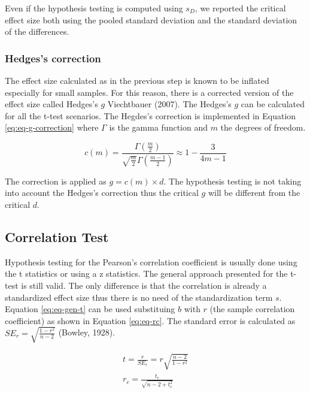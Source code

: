 \documentclass[
  man]{apa7}
\begin{document}
Even if the hypothesis testing is computed using \(s_D\), we reported the critical effect size both using the pooled standard deviation and the standard deviation of the differences.

\hypertarget{hedgess-correction}{%
\subsubsection{Hedges's correction}\label{hedgess-correction}}

The effect size calculated as in the previous step is known to be inflated especially for small samples. For this reason, there is a corrected version of the effect size called Hedges's \(g\) Viechtbauer (2007). The Hedges's \(g\) can be calculated for all the t-test scenarios. The Hegdes's correction is implemented in Equation \eqref{eq:eq-g-correction} where \(\Gamma\) is the gamma function and \(m\) the degrees of freedom.

\begin{equation}
\label{eq:eq-g-correction}
c(m) = \frac{\Gamma\left(\frac{m}{2}\right)}{\sqrt{\frac{m}{2}} \Gamma\left(\frac{m-1}{2}\right)} \approx 1 - \frac{3}{4m - 1}
\end{equation}

The correction is applied as \(g = c(m) \times d\). The hypothesis testing is not taking into account the Hedges's correction thus the critical \(g\) will be different from the critical \(d\).

\hypertarget{correlation-test}{%
\subsection{Correlation Test}\label{correlation-test}}

Hypothesis testing for the Pearson's correlation coefficient is usually done using the t statistics or using a z statistics. The general approach presented for the t-test is still valid. The only difference is that the correlation is already a standardized effect size thus there is no need of the standardization term \(s\). Equation \eqref{eq:eq-gen-t} can be used substituing \(b\) with \(r\) (the sample correlation coefficient) as shown in Equation \eqref{eq:eq-rc}. The standard error is calculated as \(SE_r = \sqrt{\frac{1 - r^2}{n - 2}}\) (Bowley, 1928).

\begin{equation}
\label{eq:eq-rc}
    \begin{gathered}
        t = \frac{r}{SE_r} = r \sqrt{\frac{n - 2}{1 - r^2}} \\
        r_c = \frac{t_c}{\sqrt{n - 2 + t_c^2}}
    \end{gathered}
\end{equation}
\end{document}

